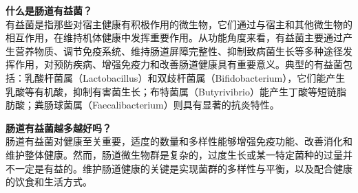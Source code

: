 \documentclass[UTF8]{ctexart}
\begin{document}
\begin{tcolorbox}[
    enhanced,
    colback=lightpurple!10, %
    colframe=lightpurple!10,  %
    arc=3mm,
    boxrule=0.5pt,
    width=\textwidth,
    top=8pt,
    bottom=8pt
]
{\small{\color{lightpurple}\faQuestionCircle}\quad \textbf{什么是肠道有益菌？}\\
{\color{orange!50}\faComments}\quad 有益菌是指那些对宿主健康有积极作用的微生物，它们通过与宿主和其他微生物的相互作用，在维持机体健康中发挥重要作用。从功能角度来看，有益菌主要通过产生营养物质、调节免疫系统、维持肠道屏障完整性、抑制致病菌生长等多种途径发挥作用，对预防疾病、增强免疫力和改善肠道健康具有重要意义。典型的有益菌包括：乳酸杆菌属（Lactobacillus）和双歧杆菌属（Bifidobacterium），它们能产生乳酸等有机酸，抑制有害菌生长；布特菌属（Butyrivibrio）能产生丁酸等短链脂肪酸；粪肠球菌属（Faecalibacterium）则具有显著的抗炎特性。
}
\end{tcolorbox}

\begin{tcolorbox}[
    enhanced,
    colback=lightpurple!10, %
    colframe=lightpurple!10,  %
    arc=3mm,
    boxrule=0.5pt,
    width=\textwidth,
    top=8pt,
    bottom=8pt
]
{\small{\color{lightpurple}\faQuestionCircle}\quad \textbf{肠道有益菌越多越好吗？}\\
{\color{orange!50}\faComments}\quad 肠道有益菌对健康至关重要，适度的数量和多样性能够增强免疫功能、改善消化和维护整体健康。然而，肠道微生物群是复杂的，过度生长或某一特定菌种的过量并不一定是有益的。维护肠道健康的关键是实现菌群的多样性与平衡，以及配合健康的饮食和生活方式。
}
\end{tcolorbox}
\end{document}
